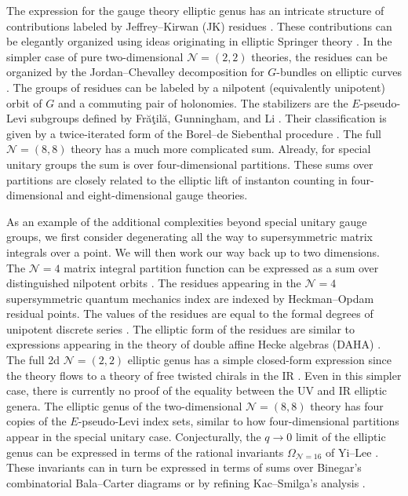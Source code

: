 \documentclass[12pt]{article}
\numberwithin{equation}{section}%
\theoremstyle{definition}
\newcommand{\cN}{\mathcal{N}}
\begin{document}
The expression for the gauge theory elliptic genus \cite{MR3177993,MR3302634} has an intricate structure of contributions labeled by Jeffrey--Kirwan (JK) residues \cite{MR1318878}.  These contributions can be elegantly organized using ideas originating in elliptic Springer theory \cite{MR3383168}.  In the simpler case of pure two-dimensional $\cN = (2,2)$ theories, the residues can be organized by
the Jordan–Chevalley decomposition for $G$-bundles on elliptic curves \cite{MR4524601}.  The groups of residues can be labeled by a nilpotent (equivalently unipotent) orbit of $G$ and a commuting pair of holonomies.  The stabilizers are the
$E$-pseudo-Levi subgroups defined by Fr\u{a}\c{t}il\u{a}, Gunningham, and Li \cite{MR4524601}.  Their classification is given by a twice-iterated form of the Borel–de Siebenthal procedure \cite{friedman1998holomorphic,MR1618343,MR1895253}.  The full $\cN = (8,8)$ theory has a much more complicated sum.  Already, for special unitary groups the sum is over four-dimensional partitions.  These sums over partitions are closely related to the elliptic lift of instanton counting in four-dimensional \cite{Nekrasov:2002qd,Nekrasov:2003rj} and eight-dimensional \cite{Nekrasov:2017cih} gauge theories.

As an example of the additional complexities beyond special unitary gauge groups, we first consider degenerating all the way to supersymmetric matrix integrals over a point.  We will then work our way back up to two dimensions.  The $\cN = 4$ matrix integral partition function can be expressed as a sum over distinguished nilpotent orbits \cite{Eager:2019bxq}.  The residues appearing in the $\cN = 4$ supersymmetric quantum mechanics index are indexed by Heckman--Opdam residual points.  The values of the residues are equal to the formal degrees of unipotent discrete series \cite{MR1748271, demartino2022unramifiedsphericalautomorphicspectrum, demartino2022residuedistributionsiteratedresidues, Eager:2019bxq}.
The elliptic form of the residues are similar to expressions appearing in the theory of double affine Hecke algebras (DAHA) \cite{cherednik2022integralformulasdahainner, lenart2023ellipticclassesperiodichecke}.  The full 2d $\mathcal{N} = (2,2)$ elliptic genus has a simple closed-form expression \cite{MR4312365} since the theory flows to a theory of free twisted chirals in the IR \cite{Aharony:2016jki}.  Even in this simpler case, there is currently no proof of the equality between the UV and IR elliptic genera.  The elliptic genus of the two-dimensional $\mathcal{N} = (8,8)$ theory has four copies of the $E$-pseudo-Levi index sets, similar to how four-dimensional partitions appear in the special unitary case.
Conjecturally, the $q \rightarrow 0$ limit of the elliptic genus can be expressed in terms of the rational invariants $\Omega_{\cN = 16}$ of Yi--Lee \cite{Lee:2016dbm}.  These invariants can in turn be expressed in terms of sums over Binegar's combinatorial Bala--Carter diagrams or by refining Kac--Smilga's analysis \cite{Kac:1999av}.
\end{document}
